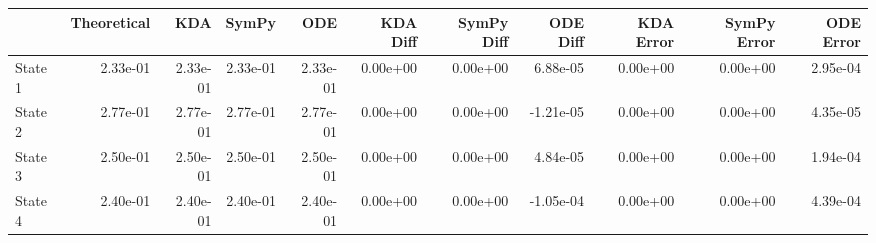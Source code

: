 \begin{tabular}{lrrrrrrrrrr}
\toprule
{} &  Theoretical &      KDA &    SymPy &      ODE &  KDA Diff &  SymPy Diff &  ODE Diff &  KDA Error &  SymPy Error &  ODE Error \\
\midrule
State 1 &     2.33e-01 & 2.33e-01 & 2.33e-01 & 2.33e-01 &  0.00e+00 &    0.00e+00 &  6.88e-05 &   0.00e+00 &     0.00e+00 &   2.95e-04 \\
State 2 &     2.77e-01 & 2.77e-01 & 2.77e-01 & 2.77e-01 &  0.00e+00 &    0.00e+00 & -1.21e-05 &   0.00e+00 &     0.00e+00 &   4.35e-05 \\
State 3 &     2.50e-01 & 2.50e-01 & 2.50e-01 & 2.50e-01 &  0.00e+00 &    0.00e+00 &  4.84e-05 &   0.00e+00 &     0.00e+00 &   1.94e-04 \\
State 4 &     2.40e-01 & 2.40e-01 & 2.40e-01 & 2.40e-01 &  0.00e+00 &    0.00e+00 & -1.05e-04 &   0.00e+00 &     0.00e+00 &   4.39e-04 \\
\bottomrule
\end{tabular}
